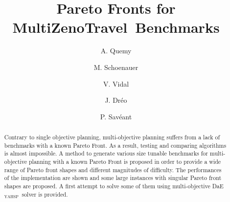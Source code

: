 \documentclass{llncs}
\newcommand{\DAEYAHSP}{{\sc DaE$_{\text{YAHSP}}$}}
\def\MULTIZENO{{\sc MultiZenoTravel}}
\begin{document}
\setlength{\parskip}{0pt}
\setlength{\parsep}{0pt}
\setlength{\headsep}{0pt}
\setlength{\topskip}{0pt}
\setlength{\topmargin}{0pt}
\setlength{\topsep}{0pt}
\setlength{\partopsep}{0pt}

\title{Pareto Fronts for \MULTIZENO\ Benchmarks} %

\author{A. Quemy  \and M. Schoenauer\and
V. Vidal  \and J. Dr\'eo \and 
P. Sav\'eant}
%
%
%

\maketitle

\begin{abstract}
Contrary to single objective planning, multi-objective planning suffers from a lack of benchmarks with a known Pareto Front. As a result, testing and comparing algorithms is almost impossible. A method to generate various size tunable benchmarks for multi-objective planning with a known Pareto Front is proposed in order to provide a wide range of Pareto front shapes and different magnitudes of difficulty. The performances of the implementation are shown and some large instances with singular Pareto front shapes are proposed. A first attempt to solve some of them using multi-objective \DAEYAHSP\ solver is provided.
\end{abstract}
%
\end{document}
